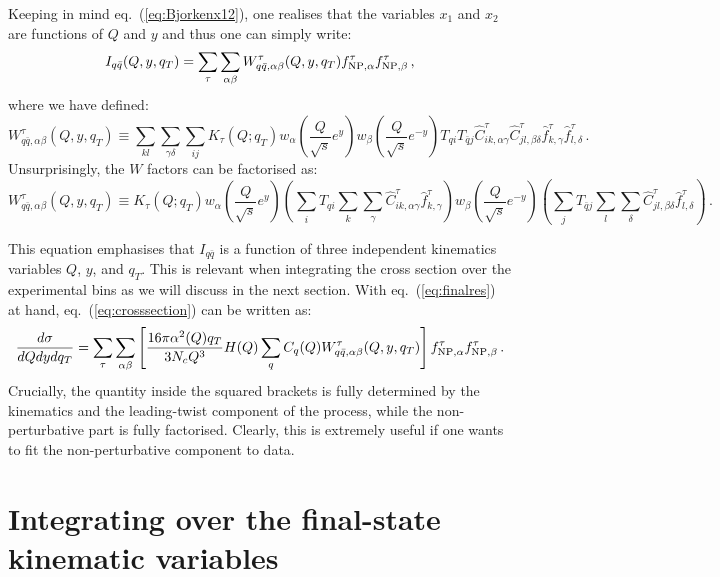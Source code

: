 \documentclass[10pt,a4paper]{article}
\begin{document}
Keeping in mind eq.~(\ref{eq:Bjorkenx12}), one realises that the
variables $x_1$ and $x_2$ are functions of $Q$ and $y$ and thus one
can simply write:
\begin{equation}\label{eq:finalres}
  I_{q\bar{q}}(Q, y, q_T) =
  \sum_\tau \sum_{\alpha\beta} W_{q\bar{q},\alpha\beta}^{\tau}(Q,y,q_T) f_{{\rm NP},\alpha}^\tau f_{{\rm NP},\beta}^\tau\,,
\end{equation}
where we have defined:
\begin{equation}
W_{q\bar{q},\alpha\beta}^{\tau}(Q,y,q_T)\equiv \sum_{kl} \sum_{\gamma\delta}\sum_{ij}K_\tau(Q;q_T) w_\alpha\left(\frac{Q}{\sqrt{s}}e^y\right)w_\beta\left(\frac{Q}{\sqrt{s}}e^{-y}\right) T_{qi}T_{\bar{q}j}\hat{C}_{ik,\alpha\gamma}^\tau
  \hat{C}_{jl,\beta\delta}^\tau \hat{f}_{k,\gamma}^\tau \hat{f}_{l,\delta}^\tau\,.
\end{equation}
Unsurprisingly, the $W$ factors can be factorised as:
\begin{equation}
  W_{q\bar{q},\alpha\beta}^{\tau}(Q,y,q_T)\equiv
  K_\tau(Q;q_T) w_\alpha\left(\frac{Q}{\sqrt{s}}e^y\right) \left(\sum_{i} T_{qi}\sum_{k} \sum_{\gamma}\hat{C}_{ik,\alpha\gamma}^\tau
    \hat{f}_{k,\gamma}^\tau\right)
w_\beta\left(\frac{Q}{\sqrt{s}}e^{-y}\right)  \left(\sum_{j} T_{\bar{q}j}\sum_{l} \sum_{\delta}
    \hat{C}_{jl,\beta\delta}^\tau \hat{f}_{l,\delta}^\tau\right)\,.
\end{equation}

This equation emphasises that $I_{q\bar{q}}$ is a function of three
independent kinematics variables $Q$, $y$, and $q_T$. This is relevant
when integrating the cross section over the experimental bins as we
will discuss in the next section. With eq.~(\ref{eq:finalres}) at
hand, eq.~(\ref{eq:crosssection}) can be written as:
\begin{equation}
\frac{d\sigma}{dQ dy dq_T} =\sum_\tau \sum_{\alpha\beta}\left[
  \frac{16\pi\alpha^2(Q)q_T}{3N_c Q^3} H(Q) 
  \sum_q C_q(Q) W_{q\bar{q},\alpha\beta}^{\tau}(Q,y,q_T) \right]f_{{\rm NP},\alpha}^\tau f_{{\rm NP},\beta}^\tau\,.
\end{equation}
Crucially, the quantity inside the squared brackets is fully
determined by the kinematics and the leading-twist component of the
process, while the non-perturbative part is fully factorised. Clearly,
this is extremely useful if one wants to fit the non-perturbative
component to data.

\section{Integrating over the final-state kinematic variables}
\end{document}

